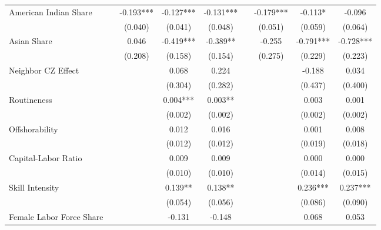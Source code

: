 \begin{table}[htbp]
\begin{tabular}{l*{8}{c}}
\addlinespace
American Indian Share&            &   -0.193***&   -0.127***&   -0.131***&            &   -0.179***&   -0.113*  &   -0.096   \\
                    &            &  (0.040)   &  (0.041)   &  (0.048)   &            &  (0.051)   &  (0.059)   &  (0.064)   \\
\addlinespace
Asian Share         &            &    0.046   &   -0.419***&   -0.389** &            &   -0.255   &   -0.791***&   -0.728***\\
                    &            &  (0.208)   &  (0.158)   &  (0.154)   &            &  (0.275)   &  (0.229)   &  (0.223)   \\
\addlinespace
Neighbor CZ Effect  &            &            &    0.068   &    0.224   &            &            &   -0.188   &    0.034   \\
                    &            &            &  (0.304)   &  (0.282)   &            &            &  (0.437)   &  (0.400)   \\
\addlinespace
Routineness         &            &            &    0.004***&    0.003** &            &            &    0.003   &    0.001   \\
                    &            &            &  (0.002)   &  (0.002)   &            &            &  (0.002)   &  (0.002)   \\
\addlinespace
Offshorability      &            &            &    0.012   &    0.016   &            &            &    0.001   &    0.008   \\
                    &            &            &  (0.012)   &  (0.012)   &            &            &  (0.019)   &  (0.018)   \\
\addlinespace
Capital-Labor Ratio &            &            &    0.009   &    0.009   &            &            &    0.000   &    0.000   \\
                    &            &            &  (0.010)   &  (0.010)   &            &            &  (0.014)   &  (0.015)   \\
\addlinespace
Skill Intensity     &            &            &    0.139** &    0.138** &            &            &    0.236***&    0.237***\\
                    &            &            &  (0.054)   &  (0.056)   &            &            &  (0.086)   &  (0.090)   \\
\addlinespace
Female Labor Force Share&            &            &   -0.131   &   -0.148   &            &            &    0.068   &    0.053   \\

\end{tabular}
\end{table}
